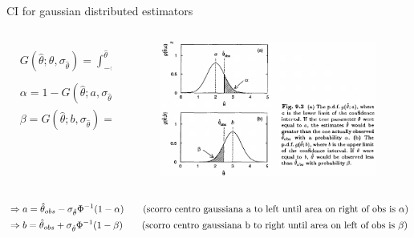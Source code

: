 \documentclass[asd-beamer.tex]{subfiles}%
\begin{document}
\begin{frame}{CI for gaussian distributed estimators}
    \begin{columns}[T]
        \begin{column}{0.65\textwidth}
      \begin{align*}
        &G(\hat{\theta};\theta,\sigma_{\hat{\theta}})=\int_{-\infty}^{\hat{\theta}}\frac{1}{\sqrt{2\pi\sigma^2_{\hat{\theta}}}}\exp{-\frac{(\hat{\theta}'-\theta)^2}{2\sigma^2_{\hat{\theta}}}}\,d\hat{\theta}'\\
        &\alpha=1-G(\hat{\theta};a,\sigma_{\hat{\theta}})=1-\Phi(\frac{\theta_{obs}-a}{\sigma_{\hat{\theta}}})\tag{Right Wing}\\
        &\beta=G(\hat{\theta};b,\sigma_{\hat{\theta}})=\Phi(\frac{\theta_{obs}-b}{\sigma_{\hat{\theta}}})\tag{Left Wing}\\
\end{align*}
        \end{column}
        \begin{column}{0.35\textwidth} 
\begin{figure}[!ht]\includegraphics[trim={0cm 0cm 0 0},clip, keepaspectratio,width=0.99\textwidth]{figures/cowan/estimators/gaussamplingpdf}\label{fig:gaussamplingpdf}\end{figure}
        \end{column}
    \end{columns}
    
    \begin{align*}
        &\Rightarrow a=\hat{\theta}_{obs}-\sigma_{\hat{\theta}}{\Phi}^{-1}(1-\alpha)\tag{scorro centro gaussiana a to left until area on right of obs is $\alpha$}\\
        &\Rightarrow b=\hat{\theta}_{obs}+\sigma_{\hat{\theta}}{\Phi}^{-1}(1-\beta)\tag{scorro centro gaussiana b to right until area on left of obs is $\beta$}
\end{align*}
\end{frame}
\end{document}

